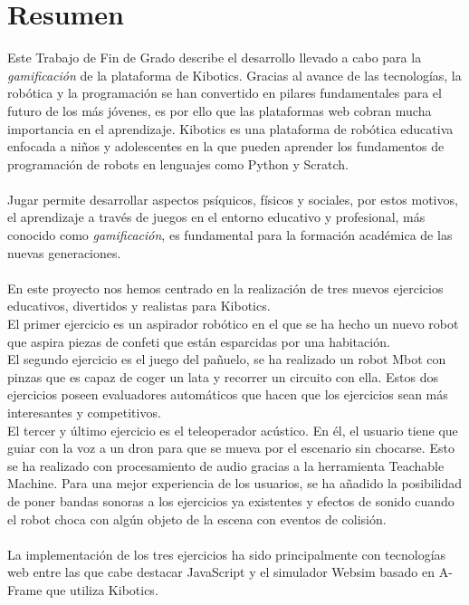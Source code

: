 \newpage
\thispagestyle{plain}			%
\setlength{\parskip}{0pt plus 1.0pt}
\section*{Resumen}
Este Trabajo de Fin de Grado describe el desarrollo llevado a cabo para la \textit{gamificación} de la plataforma de Kibotics.  
Gracias al avance de las tecnologías, la robótica y la programación se han convertido en pilares fundamentales para el futuro de los más jóvenes, es por ello que las plataformas web cobran mucha importancia en el aprendizaje. Kibotics es una plataforma de robótica educativa enfocada a niños y adolescentes en la que pueden aprender los fundamentos de programación de robots en lenguajes como Python y Scratch. 
\\
\\
Jugar permite desarrollar aspectos psíquicos, físicos y sociales, por estos motivos, el aprendizaje a través de juegos en el entorno educativo y profesional, más conocido como \textit{gamificación}, es fundamental para la formación académica de las nuevas generaciones.
 \\
 \\
En este proyecto nos hemos centrado en la realización de tres nuevos ejercicios educativos, divertidos y realistas para Kibotics.
\\
El primer ejercicio  es un aspirador robótico en el que se ha hecho un nuevo robot que aspira piezas de confeti que están esparcidas por una habitación.
\\
El segundo  ejercicio  es el juego del pañuelo, se ha realizado un robot Mbot con pinzas que es capaz de coger un lata y recorrer un circuito con ella. 
Estos dos ejercicios poseen evaluadores automáticos que hacen que los ejercicios sean más interesantes y competitivos.
\\
El tercer y último ejercicio es el teleoperador acústico. En él,  el usuario tiene que guiar con la voz a un dron para que se mueva por el escenario sin chocarse. Esto se ha realizado con procesamiento de audio gracias a la herramienta Teachable Machine.
Para una mejor experiencia de los usuarios, se ha  añadido la posibilidad de poner bandas sonoras a los ejercicios ya existentes y efectos de sonido cuando el robot choca con algún objeto de la escena con eventos de colisión.
\\
\\
La implementación de los tres ejercicios ha sido principalmente con tecnologías web entre las que cabe destacar JavaScript y el simulador Websim basado en A-Frame que utiliza Kibotics.



